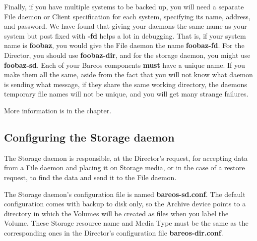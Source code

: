 Finally, if you have multiple systems to be backed up, you will need a
separate File daemon or Client specification for each system, specifying its
name, address, and password. We have found that giving your daemons the same
name as your system but post fixed with {\bf -fd} helps a lot in debugging.
That is, if your system name is {\bf foobaz}, you would give the File daemon
the name {\bf foobaz-fd}. For the Director, you should use {\bf foobaz-dir},
and for the storage daemon, you might use {\bf foobaz-sd}.
Each of your Bareos components {\bf must} have a unique name.  If you
make them all the same, aside from the fact that you will not
know what daemon is sending what message, if they share the same
working directory, the daemons temporary file names will not
be unique, and you will get many strange failures.

More information is in the
 chapter.

\subsection{Configuring the Storage daemon}

The Storage daemon is responsible, at the Director's request, for accepting
data from a File daemon and placing it on Storage media, or in the case of a
restore request, to find the data and send it to the File daemon.

The Storage daemon's configuration file is named {\bf bareos-sd.conf}.
The default configuration comes with backup to disk only,
so the Archive device points to a directory in which the
Volumes will be created as files when you label the Volume.
These Storage resource name and
Media Type must be the same as the corresponding ones in the Director's
configuration file {\bf bareos-dir.conf}.
\label{ConfigTesting}

